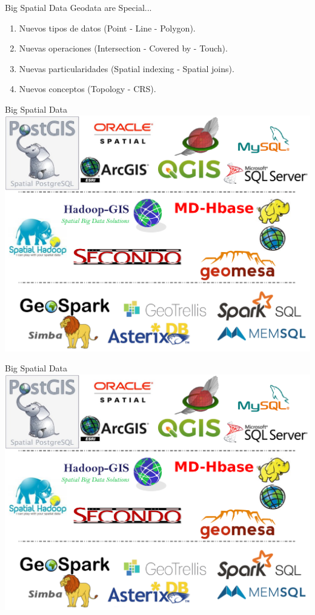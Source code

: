 \documentclass{beamer}
\begin{document}
\begin{frame}{Big Spatial Data}
    Geodata are Special... \\
    \begin{enumerate}
        \item Nuevos tipos de datos (Point - Line - Polygon).
        \item Nuevas operaciones (Intersection - Covered by - Touch).
        \item Nuevas particularidades (Spatial indexing - Spatial joins).
        \item Nuevos conceptos (Topology - CRS).
    \end{enumerate}
\end{frame}

\begin{frame}{Big Spatial Data}
  \centering
  \includegraphics[clip, trim=0cm 14cm 0cm 0cm, width=0.85\linewidth]{figures/logos}
\end{frame}

\begin{frame}[noframenumbering]{Big Spatial Data}
  \centering
  \includegraphics[clip, trim=0cm 6cm 0cm 0cm, width=0.85\linewidth]{figures/logos}
\end{frame}
\end{document}
